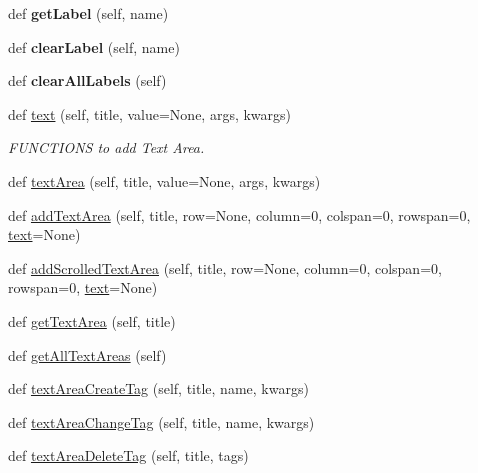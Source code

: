 \begin{DoxyCompactItemize}
\item 
\mbox{\label{classappjar_1_1gui_a28d7281e96bf719a419be4dd16eab2f2}} 
def {\bfseries get\+Label} (self, name)
\item 
\mbox{\label{classappjar_1_1gui_a6c32d0c0a4f92d8291a7d6c29c072033}} 
def {\bfseries clear\+Label} (self, name)
\item 
\mbox{\label{classappjar_1_1gui_aa4e6141e82f72fadfacaad90cc677d59}} 
def {\bfseries clear\+All\+Labels} (self)
\item 
def \hyperlink{classappjar_1_1gui_a221b516425bf76dd8560ec9f4818182f}{text} (self, title, value=None, args, kwargs)
\begin{DoxyCompactList}\small\item\em F\+U\+N\+C\+T\+I\+O\+NS to add Text Area. \end{DoxyCompactList}\item 
def \hyperlink{classappjar_1_1gui_a92a960100d96abbccf9bf9dab549f4bf}{text\+Area} (self, title, value=None, args, kwargs)
\item 
def \hyperlink{classappjar_1_1gui_aa969d708e48ef4204432e51e41bd564a}{add\+Text\+Area} (self, title, row=None, column=0, colspan=0, rowspan=0, \hyperlink{classappjar_1_1gui_a221b516425bf76dd8560ec9f4818182f}{text}=None)
\item 
def \hyperlink{classappjar_1_1gui_a46cb4b1c4b777c1f2590012429897b40}{add\+Scrolled\+Text\+Area} (self, title, row=None, column=0, colspan=0, rowspan=0, \hyperlink{classappjar_1_1gui_a221b516425bf76dd8560ec9f4818182f}{text}=None)
\item 
def \hyperlink{classappjar_1_1gui_ad1565f18558656d50460171506cce7ee}{get\+Text\+Area} (self, title)
\item 
def \hyperlink{classappjar_1_1gui_ad9495afc9d159e2562ef5eb887842825}{get\+All\+Text\+Areas} (self)
\item 
def \hyperlink{classappjar_1_1gui_a862a8218a78d436eba57eaea79d9ccbc}{text\+Area\+Create\+Tag} (self, title, name, kwargs)
\item 
def \hyperlink{classappjar_1_1gui_abb08ae3acbd35bf473c5940b709b9144}{text\+Area\+Change\+Tag} (self, title, name, kwargs)
\item 
def \hyperlink{classappjar_1_1gui_adc81336f92d4e6b65eb82caad5a6904c}{text\+Area\+Delete\+Tag} (self, title, tags)
\item 

\end{DoxyCompactItemize}
